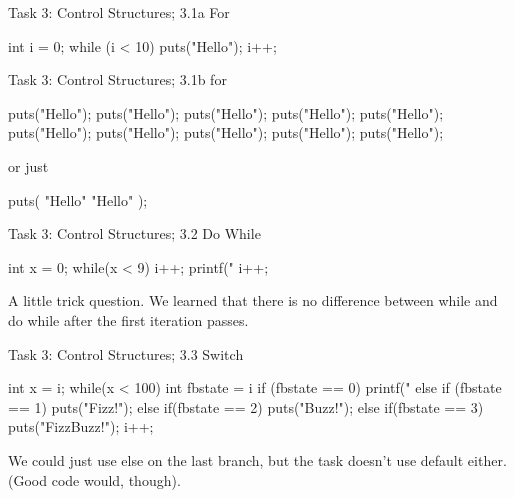 \documentclass[10pt,graphics,aspectratio=169,table]{beamer}
\begin{document}
\begin{frame}[fragile]{Task 3: Control Structures; 3.1a For}
    \begin{codeblock}
int i = 0; 
while (i < 10) {
    puts("Hello");
    i++;
}
    \end{codeblock}
\end{frame}

\begin{frame}[fragile]{Task 3: Control Structures; 3.1b for}
    \begin{codeblock}
puts("Hello");
puts("Hello");
puts("Hello");
puts("Hello");
puts("Hello");
puts("Hello");
puts("Hello");
puts("Hello");
puts("Hello");
puts("Hello");
    \end{codeblock}

    or just 
    \begin{codeblock}
puts(
    "Hello\nHello\nHello\nHello\nHello\n"
    "Hello\nHello\nHello\nHello\nHello"
);
    \end{codeblock}
\end{frame}

\begin{frame}[fragile]{Task 3: Control Structures; 3.2 Do While}
    \begin{codeblock}
int x = 0;
while(x < 9){
    i++;
    printf("%
    i++; 
}
    \end{codeblock}

A little trick question. We learned that there is no difference between
while and do while after the first iteration passes.
\end{frame}

\begin{frame}[fragile]{Task 3: Control Structures; 3.3 Switch}
    \begin{codeblock}
int x = i;
while(x < 100){
    int fbstate = i %
    if (fbstate == 0) printf("%
    else if (fbstate == 1) puts("Fizz!");
    else if(fbstate == 2) puts("Buzz!");
    else if(fbstate == 3) puts("FizzBuzz!"); 
    i++; 
}
    \end{codeblock}

    We could just use else on the last branch, 
    but the task doesn't use default either. (Good code would, though).
\end{frame}
\end{document}
